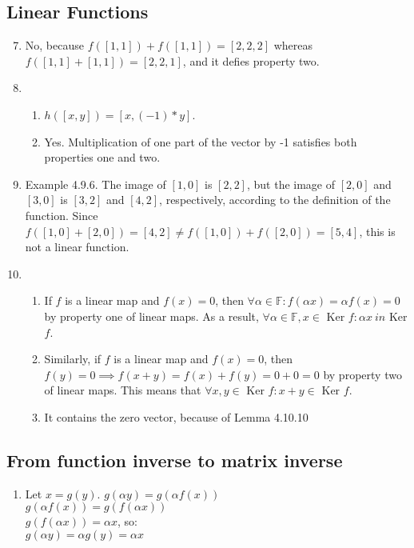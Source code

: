 \documentclass{article}
\begin{document}
    \subsection{Linear Functions}
    \begin{enumerate}
        \setcounter{enumi}{6}
        \item No, because $f([1,1]) + f([1,1]) = [2,2,2]$ whereas $f([1,1] + [1,1]) = [2,2,1]$, and it defies property two.
        \item 
            \begin{enumerate}
                \item $h([x,y]) = [x,(-1)*y]$.
                \item Yes. Multiplication of one part of the vector by -1 satisfies both properties one and two.
            \end{enumerate}
        \item Example 4.9.6. The image of $[1,0]$ is $[2,2]$, but the image of
            $[2,0]$ and $[3,0]$ is $[3,2]$ and $[4,2]$, respectively, according
            to the definition of the function.  Since $f([1,0] + [2,0]) = [4,2]
            \neq f([1,0]) + f([2,0]) = [5,4]$, this is not a linear function.
            \setcounter{enumi}{12}
        \item 
            \begin{enumerate}
                \item If $f$ is a linear map and $f(x) = 0$, then $\forall \alpha \in
                    \mathbb{F}: f(\alpha x) = \alpha f(x) = 0$ by property one of linear maps.
                    As a result, $\forall \alpha \in \mathbb{F}, x \in$ Ker $f: \alpha x \ in$ Ker $f$.
                \item Similarly, if $f$ is a linear map and $f(x) = 0$, then
                    $f(y) = 0 \implies f(x + y) = f(x) + f(y) = 0 + 0 = 0$ by
                    property two of linear maps. This means that
                    $\forall x,y \in$ Ker $f: x+y \in$ Ker $f$.
                \item It contains the zero vector, because of Lemma 4.10.10
            \end{enumerate}
    \end{enumerate}
    \setcounter{subsection}{12}
    \subsection{From function inverse to matrix inverse}
    \begin{enumerate}
        \item Let $x = g(y)$.
            $g(\alpha y) = g(\alpha f(x))$ \\
            $g(\alpha f(x)) = g(f(\alpha x))$ \\
            $g(f(\alpha x)) = \alpha x$, so: \\
            $g(\alpha y) = \alpha g(y) = \alpha x$
    \end{enumerate}
    \setcounter{subsection}{15}
\end{document}
